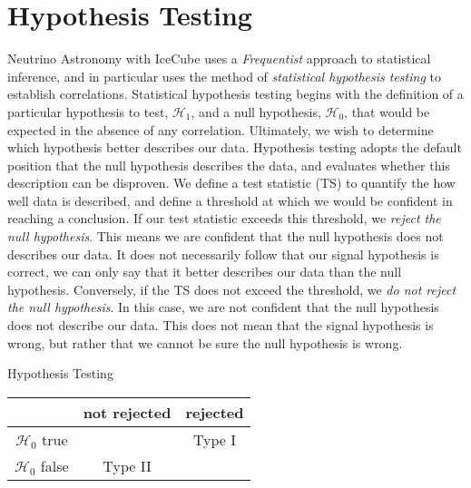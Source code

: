 \section{Hypothesis Testing}
Neutrino Astronomy with IceCube uses a \emph{Frequentist} approach to statistical inference, and in particular uses the method of \emph{statistical hypothesis testing} to establish correlations. Statistical hypothesis testing begins with the definition of a particular hypothesis to test, $\mathcal{H_{1}}$, and a null hypothesis, $\mathcal{H_{0}}$, that would be expected in the absence of any correlation. Ultimately, we wish to determine which hypothesis better describes our data. Hypothesis testing adopts the default position that the null hypothesis describes the data, and evaluates whether this description can be disproven. We define a test statistic (TS) to quantify the how well data is described, and define a threshold at which we would be confident in reaching a conclusion. If our test statistic exceeds this threshold, we \emph{reject the null hypothesis}. This means we are confident that the null hypothesis does not describes our data. It does not necessarily follow that our signal hypothesis is correct, we can only say that it better describes our data than the null hypothesis. Conversely, if the TS does not exceed the threshold,  we \emph{do not reject the null hypothesis}. In this case, we are not confident that the null hypothesis does not describe our data. This does not mean that the signal hypothesis is wrong, but rather that we cannot be sure the null hypothesis is wrong. 

\begin{margintable}
	\caption[]{Hypothesis Testing}
	\raggedright
	\begin{tabular}{ c|  c c}
		\hline
		& not rejected & rejected \\
		\hline
		$\mathcal{H_{0}}$ true & \checkmark & Type I \\
		$\mathcal{H_{0}}$ false &Type II & \checkmark\\
		\hline
	\end{tabular}
	\label{tab:hypothesis}
\end{margintable}

